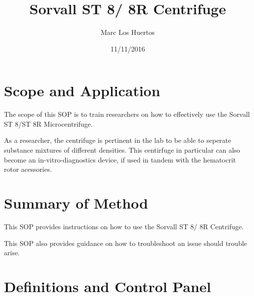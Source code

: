 \documentclass[12pt]{../SOP3_beta}
\title{Sorvall ST 8/ 8R Centrifuge}
\date{11/11/2016}
\author{Marc Los Huertos}
\begin{document}


\maketitle

\section{Scope and Application}

\NP The scope of this SOP is to train researchers on how to effectively use the Sorvall ST 8/ST 8R Microcentrifuge.

\NP As a researcher, the centrifuge is pertinent in the lab to be able to seperate substance mixtures of different densities. This centirfuge in particular can also become an in-vitro-diagnostics device, if used in tandem with the hematocrit rotor acessories. 


\section{Summary of Method}

\NP This SOP provides instructions on how to use the Sorvall ST 8/ 8R Centrifuge.

\NP This SOP also provides guidance on how to troubleshoot an issue should trouble arise. 

\tableofcontents

\newpage

\section{Definitions and Control Panel}
\end{document}
